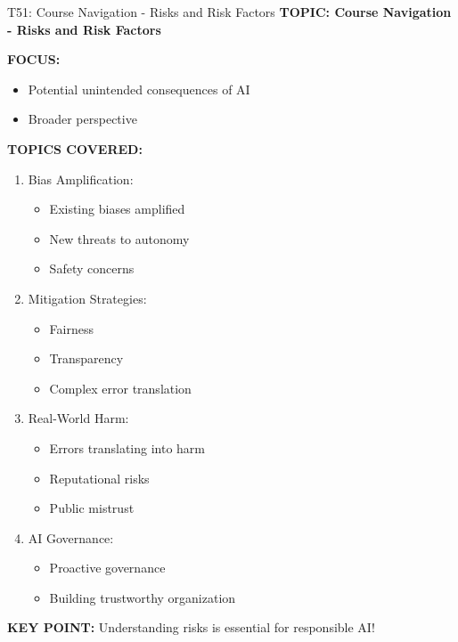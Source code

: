 \documentclass[8pt]{beamer}
\begin{document}
	\begin{frame}{T51: Course Navigation - Risks and Risk Factors}
		\fontsize{6.5}{7.5}\selectfont
		\textbf{TOPIC: Course Navigation - Risks and Risk Factors}
		
		\vspace{0.1cm}
		\textbf{FOCUS:}
		\begin{itemize}
			\item Potential unintended consequences of AI
			\item Broader perspective
		\end{itemize}
		
		\vspace{0.1cm}
		\textbf{TOPICS COVERED:}
		\begin{enumerate}
			\item \textcolor{myblue}{Bias Amplification:}
			\begin{itemize}
				\item Existing biases amplified
				\item New threats to autonomy
				\item Safety concerns
			\end{itemize}
			\item \textcolor{myblue}{Mitigation Strategies:}
			\begin{itemize}
				\item Fairness
				\item Transparency
				\item Complex error translation
			\end{itemize}
			\item \textcolor{myblue}{Real-World Harm:}
			\begin{itemize}
				\item Errors translating into harm
				\item Reputational risks
				\item Public mistrust
			\end{itemize}
			\item \textcolor{myblue}{AI Governance:}
			\begin{itemize}
				\item Proactive governance
				\item Building trustworthy organization
			\end{itemize}
		\end{enumerate}
		
		\textcolor{myred}{\textbf{KEY POINT:}} Understanding risks is \textcolor{myblue}{essential for responsible AI}!
	\end{frame}
	
\end{document}
